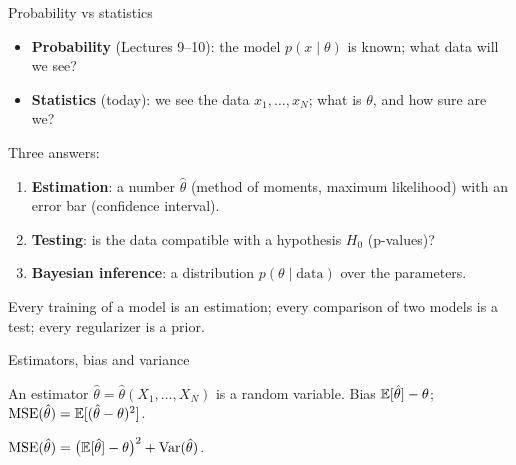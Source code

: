 \documentclass[aspectratio=1610,11pt]{beamer}
\begin{document}
\begin{frame}{Probability vs statistics}
    \small
    \begin{itemize}
        \item \textbf{Probability} (Lectures 9--10): the model $p(x \mid \theta)$ is known; what data will we see?
        \item \textbf{Statistics} (today): we see the data $x_1, \ldots, x_N$; what is $\theta$, and how sure are we?
    \end{itemize}
    Three answers:
    \begin{enumerate}
        \item \textbf{Estimation}: a number $\hat\theta$ (method of moments, maximum likelihood) with an error bar (confidence interval).
        \item \textbf{Testing}: is the data compatible with a hypothesis $H_0$ (p-values)?
        \item \textbf{Bayesian inference}: a distribution $p(\theta \mid \text{data})$ over the parameters.
    \end{enumerate}
    Every training of a model is an estimation; every comparison of two models is a test; every regularizer is a prior.
\end{frame}


\begin{frame}{Estimators, bias and variance}
    \begin{definition}
        \small An estimator $\hat\theta = \hat\theta(X_1, \ldots, X_N)$ is a random variable. Bias $\mathbb{E}[\hat\theta] - \theta$; \ $\mathrm{MSE}(\hat\theta) = \mathbb{E}[(\hat\theta - \theta)^2]$.
    \end{definition}
    \begin{proposition}
        \small $\mathrm{MSE}(\hat\theta) = \big(\mathbb{E}[\hat\theta] - \theta\big)^2 + \operatorname{Var}(\hat\theta)$.
    \end{proposition}
\end{frame}
\end{document}
